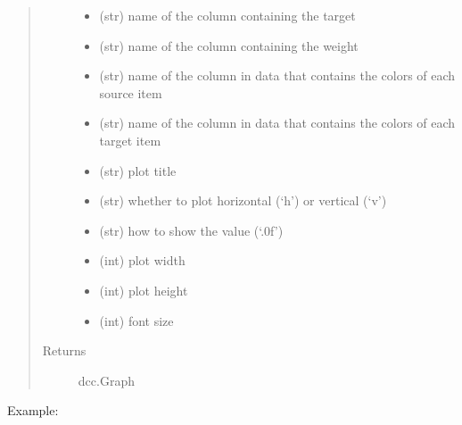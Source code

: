 \documentclass[letterpaper,10pt,english]{sphinxmanual}
\begin{document}
\begin{fulllineitems}
\begin{quote}
\begin{description}
\begin{itemize}
\item {} 
 (str) \textendash{} name of the column containing the target

\item {} 
 (str) \textendash{} name of the column containing the weight

\item {} 
 (str) \textendash{} name of the column in data that contains the colors of each source item

\item {} 
 (str) \textendash{} name of the column in data that contains the colors of each target item

\item {} 
 (str) \textendash{} plot title

\item {} 
 (str) \textendash{} whether to plot horizontal (‘h’) or vertical (‘v’)

\item {} 
 (str) \textendash{} how to show the value (‘.0f’)

\item {} 
 (int) \textendash{} plot width

\item {} 
 (int) \textendash{} plot height

\item {} 
 (int) \textendash{} font size

\end{itemize}

\item[{Returns}] \leavevmode
dcc.Graph

\end{description}\end{quote}

Example:


\end{fulllineitems}
\end{document}
